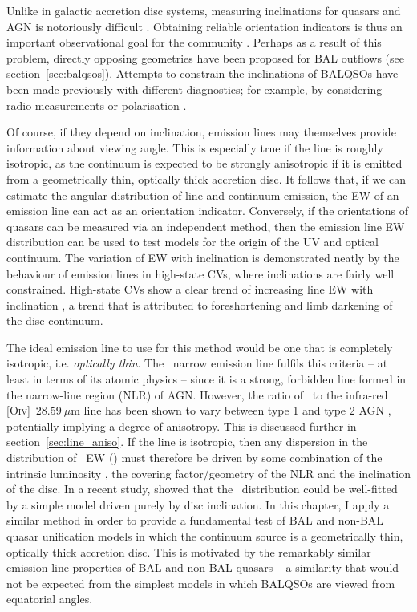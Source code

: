 Unlike in galactic accretion disc systems, measuring inclinations
for quasars and AGN is notoriously difficult \citep[see e.g.][]{marin2016}. 
Obtaining reliable orientation indicators is thus an important observational
goal for the community \citep[see e.g.][]{marin2016}. 
Perhaps as a result of this problem, 
directly opposing geometries have been proposed for 
BAL outflows (see section~\ref{sec:balqsos}). 
Attempts to constrain the inclinations
of BALQSOs have been made previously with
different diagnostics; for example, by considering 
radio measurements \citep{zhou2006,dipompeo2012a} or
polarisation \citep{brotherton2006}.  

Of course, if they depend on inclination, emission lines may themselves 
provide information about viewing angle. 
This is especially true if the line is roughly isotropic, as 
the continuum is expected to be strongly anisotropic if it is emitted from a 
geometrically thin, optically thick accretion disc. 
It follows that, if we can estimate the angular distribution of line and continuum emission,
the EW of an emission line can act as an orientation indicator. Conversely, if the orientations
of quasars can be measured via an independent method, 
then the emission line EW distribution can be used to test models
for the origin of the UV and optical continuum.
The variation of EW with inclination is demonstrated neatly by the behaviour 
of emission lines in high-state CVs, where inclinations are fairly well constrained.
High-state CVs show a clear trend of increasing line EW with inclination 
\citep[][see also sections~\ref{sec:NLs} and \ref{sec:modela_spectra}]{hessman1984,patterson1984,echevarria1988,noebauer},
a trend that is attributed to foreshortening and limb darkening of the disc continuum.

The ideal emission line to use for this method would be one that is completely isotropic,
i.e. {\em optically thin}. The \oiiifull\ narrow emission line fulfils this criteria -- at least in terms of its atomic physics -- since it 
is a strong, forbidden line formed in the narrow-line region (NLR) of AGN. However,
the ratio of \oiiifull\ to the infra-red [O\textsc{iv}]~$28.59~\mu$m line has been shown to
vary between type 1 and type 2 AGN \citep{kraemer2011}, potentially implying a degree of anisotropy.
This is discussed further in section~\ref{sec:line_aniso}.
If the line is isotropic, then any dispersion in the distribution of \oiiifull\ EW (\ewo) 
must therefore be driven by some combination of
the intrinsic luminosity \citep{borosongreen}, 
the covering factor/geometry of the NLR \citep{baskin2005} and the 
inclination of the disc. In a recent study, \citet{risaliti2011} showed that 
the \ewo\ distribution could be well-fitted by a simple model driven purely by disc inclination.
In this chapter, I apply a similar method in order to provide a fundamental test of
BAL and non-BAL quasar unification models in which the continuum source is a geometrically
thin, optically thick accretion disc. This is motivated by the remarkably similar
emission line properties of BAL and non-BAL quasars -- a similarity that would not
be expected from the simplest models in which BALQSOs are viewed from equatorial angles.

